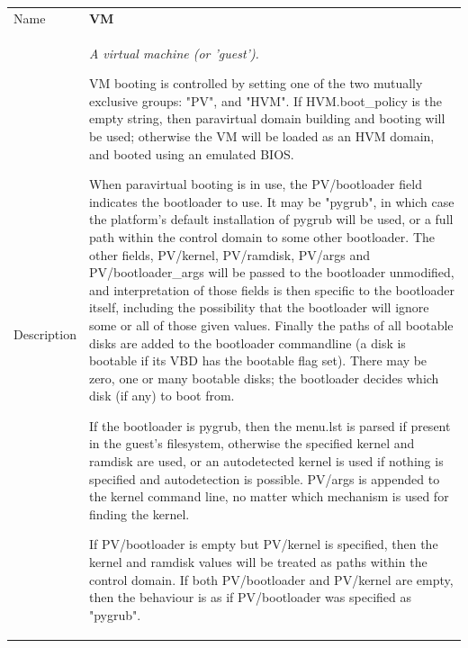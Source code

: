 \begin{longtable}{|lllp{}|}
\hline
\multicolumn{1}{|l}{Name} & \multicolumn{3}{l|}{\bf VM} \\
\multicolumn{1}{|l}{Description} & \multicolumn{3}{l|}{\parbox{11cm}{\em A
virtual machine (or 'guest').

VM booting is controlled by setting one of the two mutually exclusive
groups: "PV", and "HVM".  If HVM.boot\_policy is the empty string, then
paravirtual domain building and booting will be used; otherwise the VM will
be loaded as an HVM domain, and booted using an emulated BIOS.

When paravirtual booting is in use, the PV/bootloader field indicates the
bootloader to use.  It may be "pygrub", in which case the platform's
default installation of pygrub will be used, or a full path within the
control domain to some other bootloader.  The other fields, PV/kernel,
PV/ramdisk, PV/args and PV/bootloader\_args will be passed to the
bootloader unmodified, and interpretation of those fields is then specific
to the bootloader itself, including the possibility that the bootloader
will ignore some or all of those given values. Finally the paths of all
bootable disks are added to the bootloader commandline (a disk is bootable
if its VBD has the bootable flag set). There may be zero, one or many
bootable disks; the bootloader decides which disk (if any) to boot from.

If the bootloader is pygrub, then the menu.lst is parsed if present in the
guest's filesystem, otherwise the specified kernel and ramdisk are used, or
an autodetected kernel is used if nothing is specified and autodetection is
possible.  PV/args is appended to the kernel command line, no matter which
mechanism is used for finding the kernel.

If PV/bootloader is empty but PV/kernel is specified, then the kernel and
ramdisk values will be treated as paths within the control domain.  If both
PV/bootloader and PV/kernel are empty, then the behaviour is as if
PV/bootloader was specified as "pygrub".

}}
\end{longtable}
